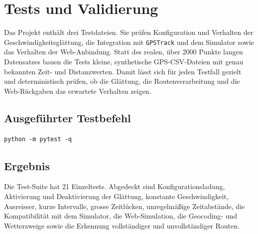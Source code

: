 \chapter{Tests und Validierung}
\label{ch:tests}

Das Projekt enthält drei Testdateien. Sie prüfen Konfiguration und Verhalten der Geschwindigkeitsglättung, die Integration mit \texttt{GPSTrack} und dem Simulator sowie das Verhalten der Web-Anbindung. Statt des realen, über 2000 Punkte langen Datensatzes bauen die Tests kleine, synthetische GPS-CSV-Dateien mit genau bekannten Zeit- und Distanzwerten. Damit lässt sich für jeden Testfall gezielt und deterministisch prüfen, ob die Glättung, die Routenverarbeitung und die Web-Rückgaben das erwartete Verhalten zeigen.

\section{Ausgeführter Testbefehl}

\begin{lstlisting}
python -m pytest -q
\end{lstlisting}

\section{Ergebnis}

Die Test-Suite hat 21 Einzeltests. Abgedeckt sind Konfigurationsladung, Aktivierung und Deaktivierung der Glättung, konstante Geschwindigkeit, Ausreisser, kurze Intervalle, grosse Zeitlücken, unregelmäßige Zeitabstände, die Kompatibilität mit dem Simulator, die Web-Simulation, die Geocoding- und Wetterzweige sowie die Erkennung vollständiger und unvollständiger Routen.

